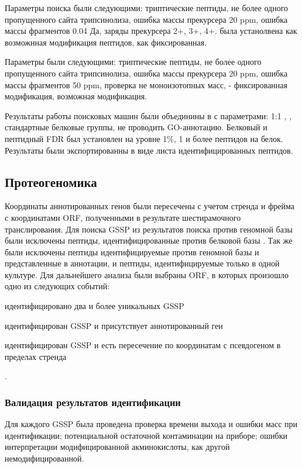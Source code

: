 Параметры поиска  были следующими: триптические пептиды, не более одного пропущенного сайта трипсинолиза, ошибка массы прекурсера 20 ppm, ошибка массы фрагментов 0.04 Да, заряды прекурсера 2+, 3+, 4+.  была устанолвена как возможнная модификация пептидов,  как фиксированная. 

Параметры  были следующими: триптические пептиды, не более одного пропущенного сайта трипсинолиза, ошибка массы прекурсера 20 ppm, ошибка массы фрагментов 50 ppm, проверка не моноизотопных масс,  - фиксированная модификация,  возможная модификация.

Результаты работы поисковых машин были объединины в  с параметрами: 1:1 , , стандартные белковые группы, не проводить GO-аннотацию. Белковый и пептидный FDR был установлен на уровне 1\%, 1 и более пептидов на белок. Результаты были экспортированны в виде листа идентифицированных пептидов.

\subsection{Протеогеномика }
Координаты аннотированных генов были пересечены с учетом стренда и фрейма с координатами ORF, полученными в результате шестирамочного транслирования.
Для поиска GSSP из результатов поиска против геномной базы  были исключены пептиды, идентифицированные против белковой базы . Так же были исключены пептиды идентифицируемые против геномной базы и представленные в аннотации, и пептиды, идентифицируемые только в одной культуре. Для дальнейшего анализа были выбраны ORF, в которых произошло одно из следующих событий:
\begin{inparaenum}
    \item идентифицировано два и более уникальных GSSP
    \item идентифицирован GSSP и присутствует аннотированный ген
    \item идентифицирован GSSP и есть пересечение по координатам с псевдогеном в пределах стренда
\end{inparaenum}.

\subsubsection{Валидация результатов идентификации}
Для каждого GSSP была проведена проверка времени выхода и ошибки масс при идентификации; потенциальной остаточной контаминации на приборе; ошибки интерпретации модифицированной акминокислоты, как другой немодифицированной.

